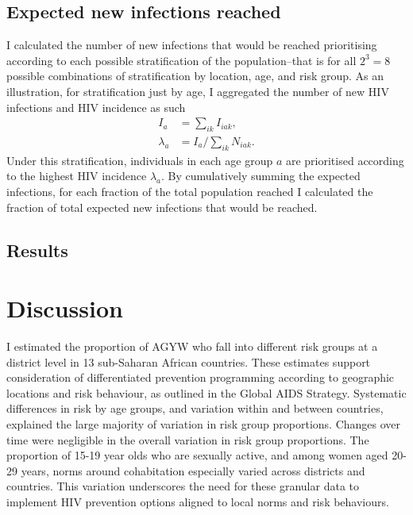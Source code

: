 \documentclass[a4paper, nobind]{templates/ociamthesis}
\begin{document}
\hypertarget{expected-new-infections-reached}{%
\subsection{Expected new infections reached}\label{expected-new-infections-reached}}

I calculated the number of new infections that would be reached prioritising according to each possible stratification of the population--that is for all \(2^3 = 8\) possible combinations of stratification by location, age, and risk group.
As an illustration, for stratification just by age, I aggregated the number of new HIV infections and HIV incidence as such
\begin{align}
    I_a &= \sum_{ik} I_{iak}, \\
    \lambda_a &= I_a / \sum_{ik} N_{iak}.
\end{align}
Under this stratification, individuals in each age group \(a\) are prioritised according to the highest HIV incidence \(\lambda_a\).
By cumulatively summing the expected infections, for each fraction of the total population reached I calculated the fraction of total expected new infections that would be reached.

\hypertarget{results-3}{%
\subsection{Results}\label{results-3}}

\hypertarget{discussion-1}{%
\section{Discussion}\label{discussion-1}}

I estimated the proportion of AGYW who fall into different risk groups at a district level in 13 sub-Saharan African countries.
These estimates support consideration of differentiated prevention programming according to geographic locations and risk behaviour, as outlined in the Global AIDS Strategy.
Systematic differences in risk by age groups, and variation within and between countries, explained the large majority of variation in risk group proportions.
Changes over time were negligible in the overall variation in risk group proportions.
The proportion of 15-19 year olds who are sexually active, and among women aged 20-29 years, norms around cohabitation especially varied across districts and countries.
This variation underscores the need for these granular data to implement HIV prevention options aligned to local norms and risk behaviours.
\end{document}
